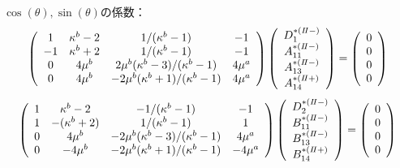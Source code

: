 $\cos(\theta),\sin(\theta)$の係数：
\begin{align}
	\left(
	\begin{array}{cccc}
		1& \kappa^b-2 & 1/(\kappa^b-1) & -1 \\
		-1 & \kappa^b+2 & 1/(\kappa^b-1) & -1 \\
		0 & 4\mu^{b} & 2\mu^{b}(\kappa^b-3)/(\kappa^b-1) & 4\mu^{a} \\
		0 & 4\mu^{b} & -2\mu^{b}(\kappa^b+1)/(\kappa^b-1) & 4\mu^{a} \\
	\end{array}
	\right)
	\left(
	\begin{array}{c}
		D_{1}^{*(I\hspace{-.15em}I-)} \\
	 	A_{11}^{*(I\hspace{-.15em}I-)} \\
		A_{13}^{*(I\hspace{-.15em}I-)}\\
	 	A_{14}^{*(I\hspace{-.15em}I+)} \\
	\end{array}
	\right)
	=
	\left(
	\begin{array}{c}
		0 \\
	 	0 \\
		0 \\
	 	0 \\
	\end{array}
	\right)
\end{align}
\begin{align}
	\left(
	\begin{array}{cccc}
		1& \kappa^b-2 & -1/(\kappa^b-1) & -1 \\
		1 & -(\kappa^b+2) & 1/(\kappa^b-1) & 1 \\
		0 & 4\mu^{b} & -2\mu^{b}(\kappa^b-3)/(\kappa^b-1) & 4\mu^{a} \\
		0 & -4\mu^{b} & -2\mu^{b}(\kappa^b+1)/(\kappa^b-1) & -4\mu^{a} \\
	\end{array}
	\right)
	\left(
	\begin{array}{c}
		D_{2}^{*(I\hspace{-.15em}I-)} \\
	 	B_{11}^{*(I\hspace{-.15em}I-)} \\
		B_{13}^{*(I\hspace{-.15em}I-)} \\
	 	B_{14}^{*(I\hspace{-.15em}I+)} \\
	\end{array}
	\right)
	=
	\left(
	\begin{array}{c}
		0 \\
	 	0 \\
		0 \\
	 	0 \\
	\end{array}
	\right)
\end{align}
\newpage

